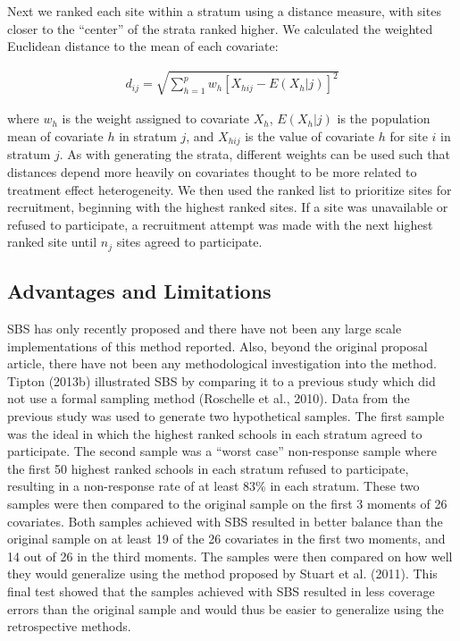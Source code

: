 \documentclass[man,floatsintext]{apa6}
\begin{document}
Next we ranked each site within a stratum using a distance measure, with sites closer to the \enquote{center} of the strata ranked higher. We calculated the weighted Euclidean distance to the mean of each covariate:

\begin{align} \label{eq:euclid}
  d_{ij} = \sqrt{\sum^p_{h=1}w_h[X_{hij} - E(X_h|j)]^2}
\end{align}

where \(w_h\) is the weight assigned to covariate \(X_h\), \(E(X_h|j)\) is the population mean of covariate \(h\) in stratum \(j\), and \(X_{hij}\) is the value of covariate \(h\) for site \(i\) in stratum \(j\). As with generating the strata, different weights can be used such that distances depend more heavily on covariates thought to be more related to treatment effect heterogeneity. We then used the ranked list to prioritize sites for recruitment, beginning with the highest ranked sites. If a site was unavailable or refused to participate, a recruitment attempt was made with the next highest ranked site until \(n_j\) sites agreed to participate.

\hypertarget{advantages-and-limitations}{%
\subsection{Advantages and Limitations}\label{advantages-and-limitations}}

SBS has only recently proposed and there have not been any large scale implementations of this method reported. Also, beyond the original proposal article, there have not been any methodological investigation into the method. Tipton (2013b) illustrated SBS by comparing it to a previous study which did not use a formal sampling method (Roschelle et al., 2010). Data from the previous study was used to generate two hypothetical samples. The first sample was the ideal in which the highest ranked schools in each stratum agreed to participate. The second sample was a \enquote{worst case} non-response sample where the first 50 highest ranked schools in each stratum refused to participate, resulting in a non-response rate of at least 83\% in each stratum. These two samples were then compared to the original sample on the first 3 moments of 26 covariates. Both samples achieved with SBS resulted in better balance than the original sample on at least 19 of the 26 covariates in the first two moments, and 14 out of 26 in the third moments. The samples were then compared on how well they would generalize using the method proposed by Stuart et al. (2011). This final test showed that the samples achieved with SBS resulted in less coverage errors than the original sample and would thus be easier to generalize using the retrospective methods.
\end{document}
